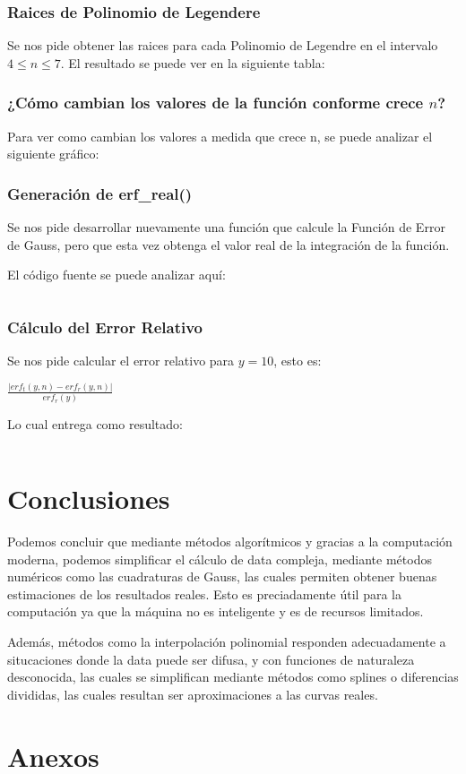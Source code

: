 \documentclass[12pt,letterpaper]{article}
\begin{document}
\subsubsection{Raices de Polinomio de Legendere}
Se nos pide obtener las raices para cada Polinomio de Legendre en el intervalo $4 \leq n \leq 7$. El resultado se puede ver en la siguiente tabla:

\subsubsection{¿Cómo cambian los valores de la función conforme crece $n$?}
Para ver como cambian los valores a medida que crece n, se puede analizar el siguiente gráfico:

\subsubsection{Generación de erf\_real()}
Se nos pide desarrollar nuevamente una función que calcule la Función de Error de Gauss, pero que esta vez obtenga el valor real de la integración de la función.

El código fuente se puede analizar aquí:
\begin{verbatim}
\end{verbatim}

\subsubsection{Cálculo del Error Relativo}
Se nos pide calcular el error relativo para $y=10$, esto es:
\begin{center}
$\frac{|erf_t(y,n) - erf_r(y,n)|}{erf_r(y)}$
\end{center}

Lo cual entrega como resultado:
\begin{verbatim}
\end{verbatim}

\section{Conclusiones}
Podemos concluir que mediante métodos algorítmicos y gracias a la computación moderna, podemos simplificar el cálculo de data compleja, mediante métodos numéricos como las cuadraturas de Gauss, las cuales permiten obtener buenas estimaciones de los resultados reales. Esto es preciadamente útil para la computación ya que la máquina no es inteligente y es de recursos limitados.

Además, métodos como la interpolación polinomial responden adecuadamente a situcaciones donde la data puede ser difusa, y con funciones de naturaleza desconocida, las cuales se simplifican mediante métodos como splines o diferencias divididas, las cuales resultan ser aproximaciones a las curvas reales.
\section{Anexos}
\end{document}
